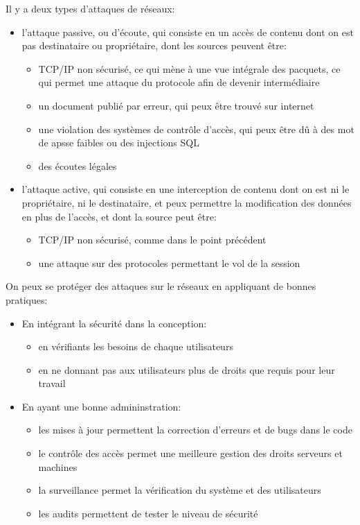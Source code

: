 Il y a deux types d'attaques de r\'eseaux:
\begin{itemize}
  \item l'attaque passive, ou d'\'ecoute, qui consiste en un acc\`es de contenu dont on est pas destinataire ou
  propri\'etaire, dont les sources peuvent \^etre:
  \begin{itemize}
    \item TCP/IP non s\'ecuris\'e, ce qui m\`ene \`a une vue int\'egrale des pacquets, ce qui permet une attaque du
    protocole afin de devenir interm\'ediaire
    \item un document publi\'e par erreur, qui peux \^etre trouv\'e sur internet
    \item une violation des syst\`emes de contr\^ole d'acc\`es, qui peux \^etre d\^u \`a des mot de apsse faibles ou des
    injections SQL
    \item des \'ecoutes l\'egales
  \end{itemize}
  \item l'attaque active, qui consiste en une interception de contenu dont on est ni le propri\'etaire, ni le
  destinataire, et peux permettre la modification des donn\'ees en plus de l'acc\`es, et dont la source peut \^etre:
  \begin{itemize}
    \item TCP/IP non s\'ecuris\'e, comme dans le point pr\'ec\'edent
    \item une attaque sur des protocoles permettant le vol de la session
  \end{itemize}
\end{itemize}

On peux se prot\'eger des attaques sur le r\'eseaux en appliquant de bonnes pratiques:
\begin{itemize}
  \item En int\'egrant la s\'ecurit\'e dans la conception:
  \begin{itemize}
    \item en v\'erifiants les besoins de chaque utilisateurs
    \item en ne donnant pas aux utilisateurs plus de droits que requis pour leur travail
  \end{itemize}
  \item En ayant une bonne admininstration:
  \begin{itemize}
    \item les mises \`a jour permettent la correction d'erreurs et de bugs dans le code
    \item le contr\^ole des acc\`es permet une meilleure gestion des droits serveurs et machines
    \item la surveillance permet la v\'erification du syst\`eme et des utilisateurs
    \item les audits permettent de tester le niveau de s\'ecurit\'e
  \end{itemize}
\end{itemize}

